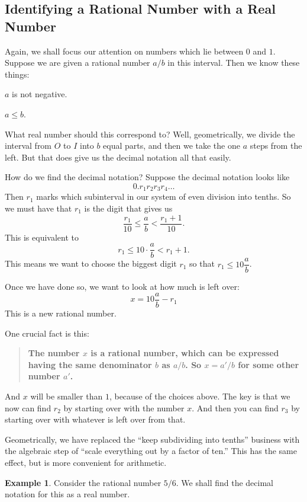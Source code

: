 \documentclass[12pt,letterpaper]{article}
\theoremstyle{definition}
\newtheorem{example}{Example}
\begin{document}
\subsection*{Identifying a Rational Number with a Real Number}

Again, we shall focus our attention on numbers which lie between $0$ and $1$.
Suppose we are given a rational number $a/b$ in this interval.
Then we know these things:
\begin{compactitem}
\item $a$ is not negative.
\item $a \leq b$.
\end{compactitem}
What real number should this correspond to?
Well, geometrically, we divide the interval from $O$ to $I$ into $b$ equal parts, and then we take the one $a$ steps from the left.
But that does give us the decimal notation all that easily.

How do we find the decimal notation?
Suppose the decimal notation looks like 
\[
0.r_1r_2r_3r_4\ldots
\]
Then $r_1$ marks which subinterval in our system of even division into tenths.
So we must have that $r_1$ is the digit that gives us
\[
\dfrac{r_1}{10} \leq \dfrac{a}{b} < \dfrac{r_1 + 1}{10}.
\]
This is equivalent to 
\[
r_1 \leq 10\cdot \dfrac{a}{b} < r_1 + 1.
\]
This means we want to choose the biggest digit $r_1$ so that $r_1 \leq 10 \dfrac{a}{b}$.

Once we have done so, we want to look at how much is left over: 
\[
x = 10\dfrac{a}{b} - r_1
\]
This is a new rational number. 

One crucial fact is this:
\begin{quote}
\textbf{The number $x$ is a rational number, which can be expressed having the same denominator $b$ as $a/b$.
So $x = a'/b$ for some other number $a'$.}
\end{quote}

And $x$ will be smaller than $1$, because of the choices above.
The key is that we now can find $r_2$ by starting over with the number $x$.
And then you can find $r_3$ by starting over with whatever is left over from that.

Geometrically, we have replaced the ``keep subdividing into tenths'' business with the algebraic step of ``scale everything out by a factor of ten.'' This has the same effect, but is more convenient for arithmetic.


\begin{example}
Consider the rational number $5/6$.
We shall find the decimal notation for this as a real number.
\end{example}
\end{document}
